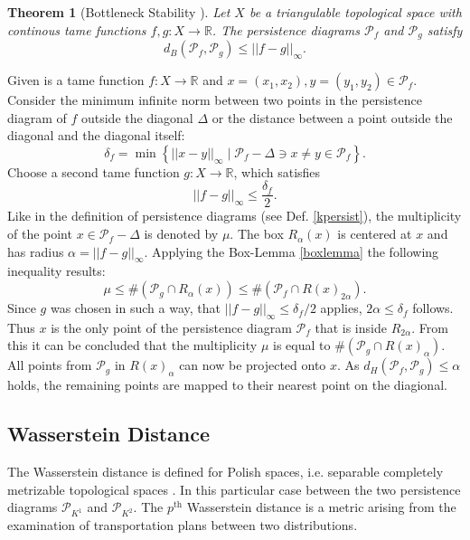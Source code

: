 \documentclass[journal]{IEEEtran}
\newtheorem{theorem}{Theorem}[section]
\begin{document}
\begin{theorem}[Bottleneck Stability \cite{Cohen-SteinerEH07}]
Let $X$ be a triangulable topological space with continous tame functions $f,g: X \rightarrow \mathbb{R}$. The persistence diagrams $\mathcal{P}_f$ and $\mathcal{P}_g$ satisfy
\begin{equation}
d_B\left(\mathcal{P}_f,\mathcal{P}_g\right) \leq ||f-g||_\infty.
\end{equation}
\end{theorem}
\begin{IEEEproof}
Given is a tame function $f: X \rightarrow \mathbb{R}$ and $x = (x_1,x_2), y=(y_1,y_2) \in \mathcal{P}_f$. Consider the minimum infinite norm between two points in the persistence diagram of $f$ outside the diagonal $\Delta$ or the distance between a point outside the diagonal and the diagonal itself:
\begin{equation}
\delta_f = \min\left\{ ||x-y||_\infty \; \bigg\vert \; \mathcal{P}_f-\Delta \ni x \neq y \in \mathcal{P}_f \right\}.
\end{equation}
Choose a second tame function $g: X \rightarrow \mathbb{R}$, which satisfies
\[
||f-g||_\infty \leq \frac{\delta_f}{2}.
\]
Like in the definition of persistence diagrams (see Def. \ref{kpersist}), the multiplicity of the point $x \in \mathcal{P}_f-\Delta$ is denoted by $\mu$. The box $R_\alpha(x)$ is centered at $x$ and has radius $\alpha = ||f-g||_\infty$. Applying the Box-Lemma \ref{boxlemma} the following inequality results:
\begin{equation}
\mu \leq \#(\mathcal{P}_g \cap R_\alpha(x)) \leq \#(\mathcal{P}_f \cap R(x)_{2\alpha}).
\end{equation}
Since $g$ was chosen in such a way, that $||f-g||_\infty \leq \delta_f / 2$ applies, $2 \alpha \leq \delta_f$ follows. Thus $x$ is the only point of the persistence diagram $\mathcal{P}_f$ that is inside $R_{2\alpha}$. From this it can be concluded that the multiplicity $\mu$ is equal to $\#(\mathcal{P}_g \cap R(x)_\alpha)$. All points from $\mathcal{P}_g$ in $R(x)_\alpha$ can now be projected onto $x$. As $d_H(\mathcal{P}_f, \mathcal{P}_g) \leq \alpha$ holds, the remaining points are mapped to their nearest point on the diagional.
\end{IEEEproof}

\subsection{Wasserstein Distance}
The Wasserstein distance is defined for Polish spaces, i.e. separable completely metrizable topological spaces \cite{boissonnat2018geometric}. In this particular case between the two persistence diagrams $\mathcal{P}_{K^1}$ and $\mathcal{P}_{K^2}$. The $p^{\text{th}}$ Wasserstein distance is a metric arising from the examination of transportation plans between two distributions.
\end{document}
